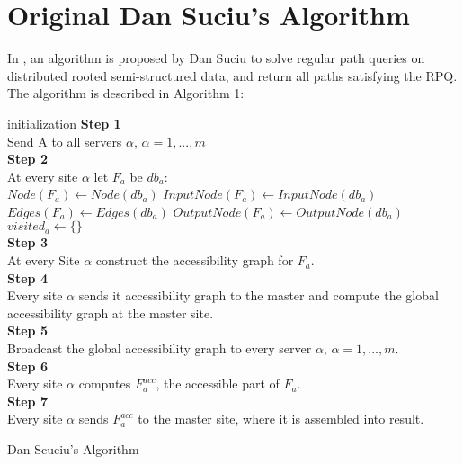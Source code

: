 \section{Original Dan Suciu's Algorithm}
In \cite{suciu2002distributed}, an algorithm is proposed by Dan Suciu to solve regular path queries on distributed rooted semi-structured data, and return all paths satisfying the RPQ. The algorithm is described in Algorithm 1:
\begin{algorithm}
    initialization\;
    \textbf{Step 1} \\Send A to all servers $\alpha$, $\alpha = 1,...,m$\\
    \textbf{Step 2} \\At every site $\alpha$ let $F_a$ be $db_a$:\\
                        $Node(F_a)\leftarrow Node(db_a)$
                        $InputNode(F_a)\leftarrow InputNode(db_a)$
                        $Edges(F_a)\leftarrow Edges(db_a)$
                        $OutputNode(F_a)\leftarrow OutputNode(db_a)$
                        $visited_a\leftarrow\{\}$ \\
    \textbf{Step 3} \\At every Site $\alpha$ construct the accessibility graph for $F_a$.\\
    \textbf{Step 4} \\Every site $\alpha$ sends it accessibility graph to the master and compute the global accessibility graph at the master site.\\
    \textbf{Step 5} \\Broadcast the global accessibility graph to every server $\alpha$, $\alpha = 1,...,m$.\\
    \textbf{Step 6} \\Every site $\alpha$ computes $F_a^{acc}$, the accessible part of $F_a$.\\
    \textbf{Step 7} \\Every site $\alpha$ sends $F_a^{acc}$ to the master site, where it is assembled into result.
    \caption{Dan Scuciu's Algorithm}
\end{algorithm}
